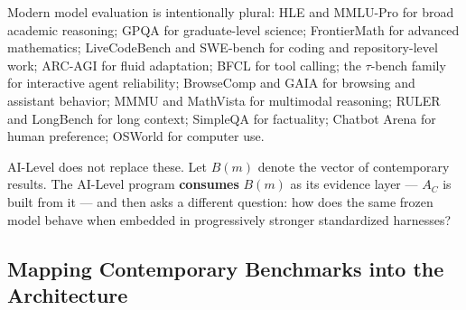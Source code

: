 Modern model evaluation is intentionally plural: HLE \citep{phan2025hle} and MMLU-Pro \citep{wang2024mmlupro} for broad academic reasoning; GPQA \citep{rein2023gpqa} for graduate-level science; FrontierMath \citep{glazer2024frontiermath} for advanced mathematics; LiveCodeBench \citep{jain2024livecodebench} and SWE-bench \citep{jimenez2023swebench} for coding and repository-level work; ARC-AGI \citep{arc2026} for fluid adaptation; BFCL \citep{patil2025bfcl} for tool calling; the $\tau$-bench family \citep{yao2024taubench} for interactive agent reliability; BrowseComp \citep{wei2025browsecomp} and GAIA \citep{mialon2023gaia} for browsing and assistant behavior; MMMU \citep{yue2023mmmu} and MathVista \citep{lu2023mathvista} for multimodal reasoning; RULER \citep{hsieh2024ruler} and LongBench \citep{bai2024longbench} for long context; SimpleQA \citep{openai2024simpleqa} for factuality; Chatbot Arena \citep{chiang2024arena} for human preference; OSWorld \citep{xie2024osworld} for computer use.

AI-Level does not replace these. Let $B(m)$ denote the vector of contemporary results. The AI-Level program \textbf{consumes} $B(m)$ as its evidence layer --- $A_C$ is built from it --- and then asks a different question: how does the same frozen model behave when embedded in progressively stronger standardized harnesses?

\subsection{Mapping Contemporary Benchmarks into the Architecture}

